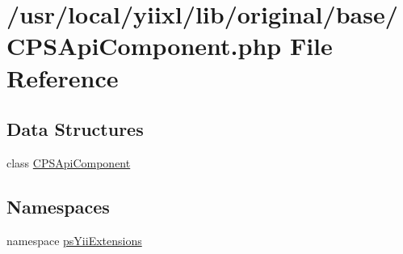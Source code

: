\hypertarget{CPSApiComponent_8php}{
\section{/usr/local/yiixl/lib/original/base/CPSApiComponent.php File Reference}
\label{CPSApiComponent_8php}
}
\subsection*{Data Structures}
\begin{DoxyCompactItemize}
\item 
class \hyperlink{classCPSApiComponent}{CPSApiComponent}
\end{DoxyCompactItemize}
\subsection*{Namespaces}
\begin{DoxyCompactItemize}
\item 
namespace \hyperlink{namespacepsYiiExtensions}{psYiiExtensions}
\end{DoxyCompactItemize}
